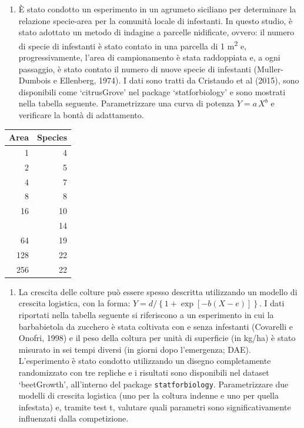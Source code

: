 \documentclass[
  12pt,
]{book}
\providecommand{\tightlist}{%
  \setlength{\itemsep}{0pt}\setlength{\parskip}{0pt}}
\begin{document}
\begin{enumerate}
\def\labelenumi{\arabic{enumi}.}
\setcounter{enumi}{1}
\tightlist
\item
  È stato condotto un esperimento in un agrumeto siciliano per determinare la relazione specie-area per la comunità locale di infestanti. In questo studio, è stato adottato un metodo di indagine a parcelle nidificate, ovvero: il numero di specie di infestanti è stato contato in una parcella di 1 m\textsuperscript{2} e, progressivamente, l'area di campionamento è stata raddoppiata e, a ogni passaggio, è stato contato il numero di nuove specie di infestanti (Muller-Dumbois e Ellenberg, 1974). I dati sono tratti da Cristaudo et al (2015), sono disponibili come `citrusGrove' nel package `statforbiology' e sono mostrati nella tabella seguente. Parametrizzare una curva di potenza \(Y = a \, X^b\) e verificare la bontà di adattamento.
\end{enumerate}

\begin{center}
\vspace{12pt}

\begin{tabular}{rr}
\toprule
Area & Species\\
\midrule
1 & 4\\
2 & 5\\
4 & 7\\
8 & 8\\
16 & 10\\
\addlinespace
32 & 14\\
64 & 19\\
128 & 22\\
256 & 22\\
\bottomrule
\end{tabular}
\end{center}

\begin{enumerate}
\def\labelenumi{\arabic{enumi}.}
\setcounter{enumi}{2}
\tightlist
\item
  La crescita delle colture può essere spesso descritta utilizzando un modello di crescita logistica, con la forma: \(Y = d /\left\{1 + \exp \left[ - b( X - e) \right] \right\}\). I dati riportati nella tabella seguente si riferiscono a un esperimento in cui la barbabietola da zucchero è stata coltivata con e senza infestanti (Covarelli e Onofri, 1998) e il peso della coltura per unità di superficie (in kg/ha) è stato misurato in sei tempi diversi (in giorni dopo l'emergenza; DAE). L'esperimento è stato condotto utilizzando un disegno completamente randomizzato con tre repliche e i risultati sono disponibili nel dataset `beetGrowth', all'interno del package \texttt{statforbiology}. Parametrizzare due modelli di crescita logistica (uno per la coltura indenne e uno per quella infestata) e, tramite test t, valutare quali parametri sono significativamente influenzati dalla competizione.
\end{enumerate}
\end{document}
